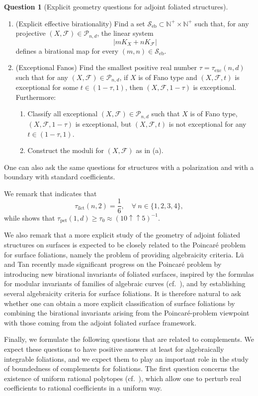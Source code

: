 \documentclass[11pt,reqno]{amsart}
\numberwithin{equation}{section}
\newcommand{\exc}{\mathrm{exc}}
\newcommand{\ilct}{\operatorname{ilct}}
\newcommand{\eb}{\operatorname{eb}}
\newcommand{\pet}{\operatorname{pet}}
\newcommand{\Ff}{\mathcal{F}}
\theoremstyle{definition}
\newtheorem{ques}[thm]{Question}
\begin{document}
\begin{ques}[Explicit geometry questions for adjoint foliated structures]
\begin{enumerate}
    \item (Explicit effective birationality) Find a set $\mathcal{S}_{\eb}\subset\mathbb N^+\times\mathbb N^+$ such that, for any projective $(X,\Ff)\in\mathcal{P}_{n,d}$, the linear system
    $$|mK_X+nK_{\Ff}|$$
    defines a birational map for every $(m,n)\in\mathcal{S}_{\eb}$.

    \item (Exceptional Fanos) Find the smallest positive real number $\tau=\tau_{\exc}(n,d)$ such that for any $(X,\Ff)\in\mathcal{P}_{n,d}$, if $X$ is of Fano type and $(X,\Ff,t)$ is exceptional for some $t\in (1-\tau,1)$, then $(X,\Ff,1-\tau)$ is exceptional. Furthermore:
    \begin{enumerate}
      \item Classify all exceptional $(X,\Ff)\in\mathcal{P}_{n,d}$ such that $X$ is of Fano type, $(X,\Ff,1-\tau)$ is exceptional, but $(X,\Ff,t)$ is not exceptional for any $t\in (1-\tau,1)$.
      \item Construct the moduli for $(X,\Ff)$ as in (a).
    \end{enumerate}
\end{enumerate}
One can also ask the same questions for structures with a polarization and with a boundary with standard coefficients. 
\end{ques}

We remark that \cite[Proposition~1.4, Example~2.16]{Xu25b} indicates that
$$\tau_{\ilct}(n,2)=\frac{1}{6},\quad \forall\ n\in\{1,2,3,4\},$$
while \cite[Theorem~5.11]{Vas25} shows that $\tau_{\pet}(1,d)\geq \tau_0\approx (10\uparrow\uparrow5)^{-1}$. 

We also remark that a more explicit study of the geometry of adjoint foliated structures on surfaces is expected to be closely related to the Poincar\'e problem for surface foliations, namely the problem of providing algebraicity criteria. L\"u and Tan \cite{LT24} recently made significant progress on the Poincar\'e problem by introducing new birational invariants of foliated surfaces, inspired by the formulas for modular invariants of families of algebraic curves (cf.~\cite{Tan96,Tan10}), and by establishing several algebraicity criteria for surface foliations. It is therefore natural to ask whether one can obtain a more explicit classification of surface foliations by combining the birational invariants arising from the Poincar\'e-problem viewpoint with those coming from the adjoint foliated surface framework.


Finally, we formulate the following questions that are related to complements. We expect these questions to have positive answers at least for algebraically integrable foliations, and we expect them to play an important role in the study of boundedness of complements for foliations. The first question concerns the existence of uniform rational polytopes (cf.~\cite{HLS24}), which allow one to perturb real coefficients to rational coefficients in a uniform way.
\end{document}
